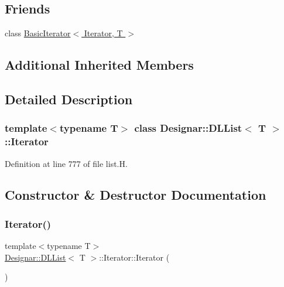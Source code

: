 \subsection*{Friends}
\begin{DoxyCompactItemize}
\item 
class \hyperlink{class_designar_1_1_d_l_list_1_1_iterator_ae3421d6be56b523bf3c41ceb29f3e5d7}{Basic\+Iterator$<$ Iterator, T $>$}
\end{DoxyCompactItemize}
\subsection*{Additional Inherited Members}


\subsection{Detailed Description}
\subsubsection*{template$<$typename T$>$\newline
class Designar\+::\+D\+L\+List$<$ T $>$\+::\+Iterator}



Definition at line 777 of file list.\+H.



\subsection{Constructor \& Destructor Documentation}
\mbox{\label{class_designar_1_1_d_l_list_1_1_iterator_a2d2ee7eeaa63b3b2e051a76fb4c4e164}} 
\subsubsection{\texorpdfstring{Iterator()}{Iterator()}\hspace{0.1cm}{\footnotesize\ttfamily [1/5]}}
{\footnotesize\ttfamily template$<$typename T$>$ \\
\hyperlink{class_designar_1_1_d_l_list}{Designar\+::\+D\+L\+List}$<$ T $>$\+::Iterator\+::\+Iterator (\begin{DoxyParamCaption}{ }\end{DoxyParamCaption})\hspace{0.3cm}{\ttfamily [inline]}}



